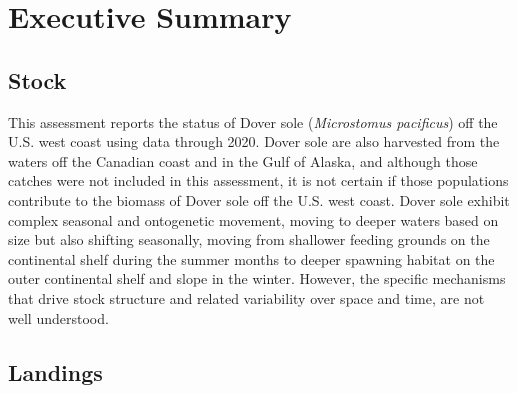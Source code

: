 \documentclass[11pt,
  english,
  a4paper,
]{article}
\begin{document}
\renewcommand{\thetable}{\roman{table}}
\renewcommand{\thefigure}{\roman{figure}}

\setlength\parskip{0.5em plus 0.1em minus 0.2em}


\hypertarget{executive-summary}{%
\section*{Executive Summary}\label{executive-summary}}

\leavevmode\tagmcend\tagstructend


\hypertarget{stock}{%
\subsection*{Stock}\label{stock}}

\leavevmode\tagmcend\tagstructend


This assessment reports the status of Dover sole (\emph{Microstomus pacificus}) off the U.S. west coast using data through 2020. Dover sole are also harvested from the waters off the Canadian coast and in the Gulf of Alaska, and although those catches were not included in this assessment, it is not certain if those populations contribute to the biomass of Dover sole off the U.S. west coast. Dover sole exhibit complex seasonal and ontogenetic movement, moving to deeper waters based on size but also shifting seasonally, moving from shallower feeding grounds on the continental shelf during the summer months to deeper spawning habitat on the outer continental shelf and slope in the winter. However, the specific mechanisms that drive stock structure and related variability over space and time, are not well understood.

\leavevmode\tagmcend\tagstructend\par


\hypertarget{landings}{%
\subsection*{Landings}\label{landings}}
\end{document}

